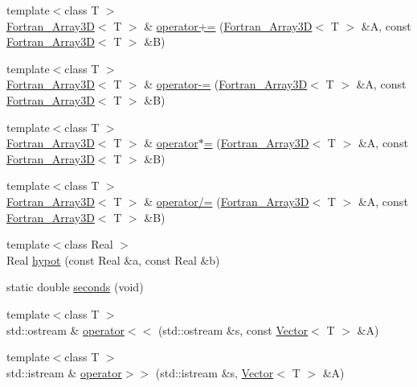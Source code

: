 \begin{DoxyCompactItemize}
\item 
{\footnotesize template$<$class T $>$ }\\\hyperlink{classTNT_1_1Fortran__Array3D}{Fortran\+\_\+\+Array3D}$<$ T $>$ \& \hyperlink{namespaceTNT_ac38073ccc2a38c912215dc2e607f1e7d}{operator+=} (\hyperlink{classTNT_1_1Fortran__Array3D}{Fortran\+\_\+\+Array3D}$<$ T $>$ \&A, const \hyperlink{classTNT_1_1Fortran__Array3D}{Fortran\+\_\+\+Array3D}$<$ T $>$ \&B)
\item 
{\footnotesize template$<$class T $>$ }\\\hyperlink{classTNT_1_1Fortran__Array3D}{Fortran\+\_\+\+Array3D}$<$ T $>$ \& \hyperlink{namespaceTNT_ac3eb8bd76e8c6e92d7633421b2f27905}{operator-\/=} (\hyperlink{classTNT_1_1Fortran__Array3D}{Fortran\+\_\+\+Array3D}$<$ T $>$ \&A, const \hyperlink{classTNT_1_1Fortran__Array3D}{Fortran\+\_\+\+Array3D}$<$ T $>$ \&B)
\item 
{\footnotesize template$<$class T $>$ }\\\hyperlink{classTNT_1_1Fortran__Array3D}{Fortran\+\_\+\+Array3D}$<$ T $>$ \& \hyperlink{namespaceTNT_a6390e0158dfa25e89cb28bb196ac9dc6}{operator$\ast$=} (\hyperlink{classTNT_1_1Fortran__Array3D}{Fortran\+\_\+\+Array3D}$<$ T $>$ \&A, const \hyperlink{classTNT_1_1Fortran__Array3D}{Fortran\+\_\+\+Array3D}$<$ T $>$ \&B)
\item 
{\footnotesize template$<$class T $>$ }\\\hyperlink{classTNT_1_1Fortran__Array3D}{Fortran\+\_\+\+Array3D}$<$ T $>$ \& \hyperlink{namespaceTNT_ae288b6afc4faaa8b3a6bc1a14c4c42b4}{operator/=} (\hyperlink{classTNT_1_1Fortran__Array3D}{Fortran\+\_\+\+Array3D}$<$ T $>$ \&A, const \hyperlink{classTNT_1_1Fortran__Array3D}{Fortran\+\_\+\+Array3D}$<$ T $>$ \&B)
\item 
{\footnotesize template$<$class Real $>$ }\\Real \hyperlink{namespaceTNT_ae102d1c8992a4fea1cc1b2efeabfcc66}{hypot} (const Real \&a, const Real \&b)
\item 
static double \hyperlink{namespaceTNT_a8543f1b2361a96f1c80e0fb796199937}{seconds} (void)
\item 
{\footnotesize template$<$class T $>$ }\\std\+::ostream \& \hyperlink{namespaceTNT_a20c2d998d51d92ef6a5f521c66bf8d0b}{operator$<$$<$} (std\+::ostream \&s, const \hyperlink{classTNT_1_1Vector}{Vector}$<$ T $>$ \&A)
\item 
{\footnotesize template$<$class T $>$ }\\std\+::istream \& \hyperlink{namespaceTNT_ad5d2fa6f96933cf8a6b3706a39582a64}{operator$>$$>$} (std\+::istream \&s, \hyperlink{classTNT_1_1Vector}{Vector}$<$ T $>$ \&A)

\end{DoxyCompactItemize}
